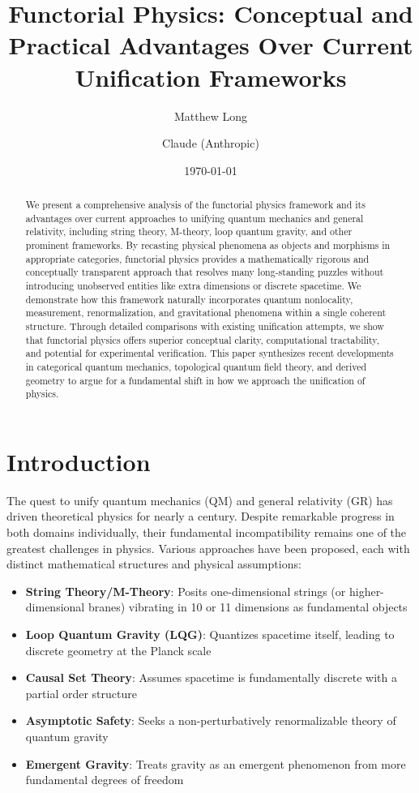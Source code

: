 \documentclass[11pt,a4paper]{article}
\title{Functorial Physics: Conceptual and Practical Advantages Over Current Unification Frameworks}
\author[1]{Matthew Long}
\author[2]{Claude (Anthropic)}
\affil[1]{Magneton Labs}
\affil[2]{AI Research Assistant}
\date{\today}
\begin{document}
\maketitle

\begin{abstract}
We present a comprehensive analysis of the functorial physics framework and its advantages over current approaches to unifying quantum mechanics and general relativity, including string theory, M-theory, loop quantum gravity, and other prominent frameworks. By recasting physical phenomena as objects and morphisms in appropriate categories, functorial physics provides a mathematically rigorous and conceptually transparent approach that resolves many long-standing puzzles without introducing unobserved entities like extra dimensions or discrete spacetime. We demonstrate how this framework naturally incorporates quantum nonlocality, measurement, renormalization, and gravitational phenomena within a single coherent structure. Through detailed comparisons with existing unification attempts, we show that functorial physics offers superior conceptual clarity, computational tractability, and potential for experimental verification. This paper synthesizes recent developments in categorical quantum mechanics, topological quantum field theory, and derived geometry to argue for a fundamental shift in how we approach the unification of physics.
\end{abstract}

\tableofcontents

\section{Introduction}

The quest to unify quantum mechanics (QM) and general relativity (GR) has driven theoretical physics for nearly a century. Despite remarkable progress in both domains individually, their fundamental incompatibility remains one of the greatest challenges in physics. Various approaches have been proposed, each with distinct mathematical structures and physical assumptions:

\begin{itemize}
    \item \textbf{String Theory/M-Theory}: Posits one-dimensional strings (or higher-dimensional branes) vibrating in 10 or 11 dimensions as fundamental objects
    \item \textbf{Loop Quantum Gravity (LQG)}: Quantizes spacetime itself, leading to discrete geometry at the Planck scale
    \item \textbf{Causal Set Theory}: Assumes spacetime is fundamentally discrete with a partial order structure
    \item \textbf{Asymptotic Safety}: Seeks a non-perturbatively renormalizable theory of quantum gravity
    \item \textbf{Emergent Gravity}: Treats gravity as an emergent phenomenon from more fundamental degrees of freedom
\end{itemize}
\end{document}

